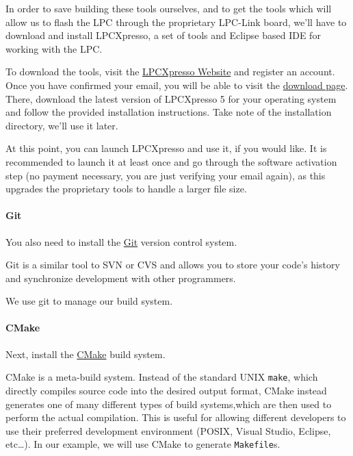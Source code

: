 \documentclass[]{article}
\begin{document}
In order to save building these tools ourselves, and to get the tools
which will allow us to flash the LPC through the proprietary LPC-Link
board, we'll have to download and install LPCXpresso, a set of tools and
Eclipse based IDE for working with the LPC.

To download the tools, visit the
\href{http://lpcxpresso.code-red-tech.com/LPCXpresso/}{LPCXpresso
Website} and register an account. Once you have confirmed your email,
you will be able to visit the
\href{http://lpcxpresso.code-red-tech.com/LPCXpresso/Downloads}{download
page}. There, download the latest version of LPCXpresso 5 for your
operating system and follow the provided installation instructions. Take
note of the installation directory, we'll use it later.

At this point, you can launch LPCXpresso and use it, if you would like.
It is recommended to launch it at least once and go through the software
activation step (no payment necessary, you are just verifying your email
again), as this upgrades the proprietary tools to handle a larger file
size.

\paragraph{Git}

You also need to install the \href{http://git-scm.com/downloads}{Git}
version control system.

Git is a similar tool to SVN or CVS and allows you to store your code's
history and synchronize development with other programmers.

We use git to manage our build system.

\paragraph{CMake}

Next, install the \href{http://www.cmake.org/}{CMake} build system.

CMake is a meta-build system. Instead of the standard UNIX
\texttt{make}, which directly compiles source code into the desired
output format, CMake instead generates one of many different types of
build systems,which are then used to perform the actual compilation.
This is useful for allowing different developers to use their preferred
development environment (POSIX, Visual Studio, Eclipse, etc\ldots{}). In
our example, we will use CMake to generate \texttt{Makefile}s.
\end{document}
